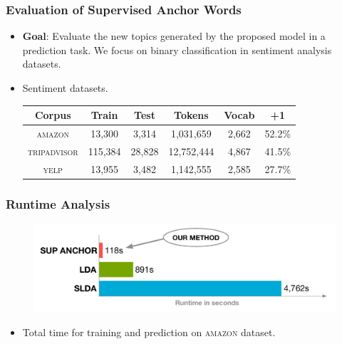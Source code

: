 \documentclass[compress]{beamer}
\newcommand{\abr}[1]{\textsc{#1}}
\newcommand{\slda}[0]{{\bf \textsc{\large{slda}}}}
\newcommand{\sank}[0]{{\bf \textsc{\large{sup~anchor}}}}
\begin{document}
\begin{frame}
\frametitle{Evaluation of Supervised Anchor Words}

\begin{itemize}
\item {\bf \large{Goal}}: Evaluate the new topics generated by the proposed model in a prediction task. We focus on binary classification in sentiment analysis datasets.
\item Sentiment datasets.
\begin{table}
   \begin{center}
    \normalsize
   \begin{tabular}{c c c c c c}
   \hline\hline
\rule{0pt}{2ex}
   Corpus&Train&Test&Tokens& Vocab& {\bf \textsc{+1}}  \\
   \hline
\rule{0pt}{2ex}
   \abr{amazon} & 13,300 & 3,314 &1,031,659&2,662  & 52.2\% \\
    \abr{tripadvisor}   & 115,384 & 28,828 &12,752,444&4,867 & 41.5\% \\
  \abr{yelp} &  13,955 & 3,482 & 1,142,555 &2,585&27.7\% \\
   \hline
   \end{tabular}
 \end{center}
\end{table}
\end{itemize}

\end{frame}

\begin{frame}
\frametitle{Runtime Analysis}

\begin{figure}
\centering
\includegraphics[width=\linewidth]{spectral/amazon_time.pdf}
\end{figure}
\begin{itemize}
\item Total time for training and prediction on \abr{amazon} dataset.
\end{itemize}
\end{frame}
\end{document}
